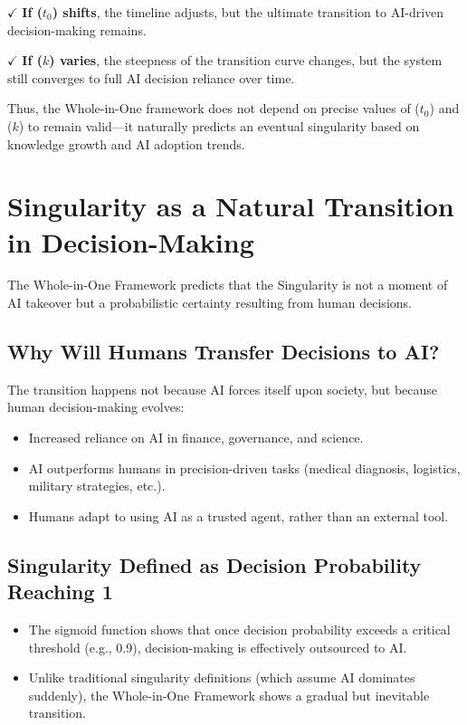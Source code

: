 \documentclass[a4]{article}
\newcommand{\bn}{\bigskip\noindent}
\newcommand{\mn}{\medskip\noindent}
\begin{document}
\mn
$\checkmark$ {\bf If ($t_0$) shifts}, the timeline adjusts, but the ultimate transition to AI-driven decision-making remains. 

\mn
 $\checkmark$ {\bf If ($k$) varies}, the steepness of the transition curve changes, but the system still converges to full AI decision reliance over time.  

\bn
Thus, the Whole-in-One framework does not depend on precise values of ($t_0$) and ($k$) to remain valid---it naturally predicts an eventual singularity based on knowledge growth and AI adoption trends.

\section{Singularity as a Natural Transition in Decision-Making}

The Whole-in-One Framework predicts that the Singularity is not a moment of AI takeover but a probabilistic certainty resulting from human decisions.

\subsection{Why Will Humans Transfer Decisions to AI?}

The transition happens not because AI forces itself upon society, but because human decision-making evolves:

\begin{itemize}
\item  Increased reliance on AI in finance, governance, and science.
\item AI outperforms humans in precision-driven tasks (medical diagnosis, logistics, military strategies, etc.).
\item  Humans adapt to using AI as a trusted agent, rather than an external tool.
\end{itemize}

\subsection{Singularity Defined as Decision Probability Reaching 1}

\begin{itemize}
\item The sigmoid function shows that once decision probability exceeds a critical threshold (e.g., 0.9), decision-making is effectively outsourced to AI.
\item Unlike traditional singularity definitions (which assume AI dominates suddenly), the Whole-in-One Framework shows a gradual but inevitable transition.
\end{itemize}
\end{document}
